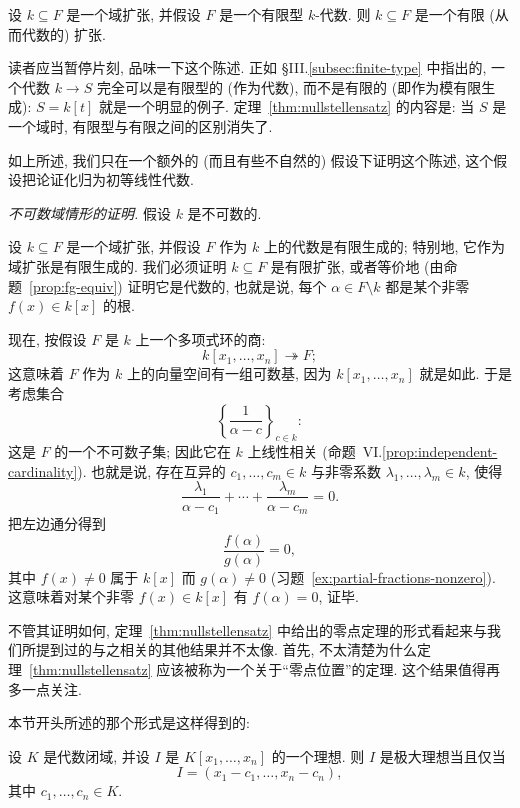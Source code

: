 \begin{theorem}[零点定理]\label{thm:nullstellensatz}
设 $k\subseteq F$ 是一个域扩张, 并假设 $F$ 是一个有限型 $k$-代数. 则 $k\subseteq F$ 是一个有限 (从而代数的) 扩张.
\end{theorem}

读者应当暂停片刻, 品味一下这个陈述. 正如 §III.\ref{subsec:finite-type} 中指出的, 一个代数 $k\to S$ 完全可以是有限型的 (作为代数), 而不是有限的 (即作为模有限生成): $S=k[t]$ 就是一个明显的例子. 定理~\ref{thm:nullstellensatz} 的内容是: 当 $S$ 是一个域时, 有限型与有限之间的区别消失了.

如上所述, 我们只在一个额外的 (而且有些不自然的) 假设下证明这个陈述, 这个假设把论证化归为初等线性代数.

\noindent\emph{不可数域情形的证明.} 假设 $k$ 是不可数的.

设 $k\subseteq F$ 是一个域扩张, 并假设 $F$ 作为 $k$ 上的代数是有限生成的; 特别地, 它作为域扩张是有限生成的. 我们必须证明 $k\subseteq F$ 是有限扩张, 或者等价地 (由命题~\ref{prop:fg-equiv}) 证明它是代数的, 也就是说, 每个 $\alpha\in F\setminus k$ 都是某个非零 $f(x)\in k[x]$ 的根.

现在, 按假设 $F$ 是 $k$ 上一个多项式环的商:
\[
k[x_1,\ldots ,x_n]\twoheadrightarrow F;
\]
这意味着 $F$ 作为 $k$ 上的向量空间有一组可数基, 因为 $k[x_1,\ldots ,x_n]$ 就是如此. 于是考虑集合
\[
\left\{\frac{1}{\alpha-c}\right\}_{c\in k}:
\]
这是 $F$ 的一个不可数子集; 因此它在 $k$ 上线性相关 (命题~VI.\ref{prop:independent-cardinality}). 也就是说, 存在互异的 $c_1,\ldots ,c_m\in k$ 与非零系数 $\lambda_1,\ldots ,\lambda_m\in k$, 使得
\[
\frac{\lambda_1}{\alpha-c_1}+\cdots +\frac{\lambda_m}{\alpha-c_m}=0.
\]
把左边通分得到
\[
\frac{f(\alpha)}{g(\alpha)}=0,
\]
其中 $f(x)\neq 0$ 属于 $k[x]$ 而 $g(\alpha)\neq 0$ (习题~\ref{ex:partial-fractions-nonzero}). 这意味着对某个非零 $f(x)\in k[x]$ 有 $f(\alpha)=0$, 证毕.

不管其证明如何, 定理~\ref{thm:nullstellensatz} 中给出的零点定理的形式看起来与我们所提到过的与之相关的其他结果并不太像. 首先, 不太清楚为什么定理~\ref{thm:nullstellensatz} 应该被称为一个关于``零点位置''的定理. 这个结果值得再多一点关注.

本节开头所述的那个形式是这样得到的:

\begin{corollary}\label{cor:maximal-ideals-points}
设 $K$ 是代数闭域, 并设 $I$ 是 $K[x_1,\ldots ,x_n]$ 的一个理想. 则 $I$ 是极大理想当且仅当
\[
I=(x_1-c_1,\ldots ,x_n-c_n),
\]
其中 $c_1,\ldots ,c_n\in K$.
\end{corollary}

